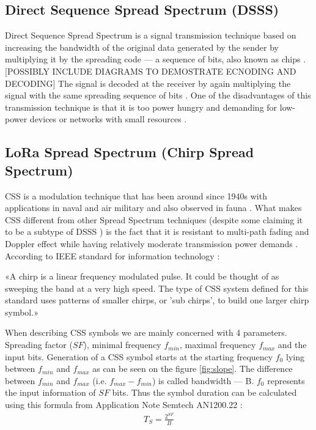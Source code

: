 \subsection{Direct Sequence Spread Spectrum (DSSS)}

Direct Sequence Spread Spectrum is a signal transmission technique based on increasing the bandwidth of the original data generated by the sender by multiplying it by the spreading code — a sequence of bits, also known as chips \cite{dsss_article}. [POSSIBLY INCLUDE DIAGRAMS TO DEMOSTRATE ECNODING AND DECODING] The signal is decoded at the receiver by again multiplying the signal with
the same spreading sequence of bits \cite{dsss_article}. One of the disadvantages of this transmission technique is that it is too power hungry and demanding for low-power devices or networks with small resources \cite{semtech_spec}.

\subsection{LoRa Spread Spectrum (Chirp Spread Spectrum)}

CSS is a modulation technique that has been around since 1940s \cite{semtech_spec} with 
applications in naval and air military and also observed in fauna \cite{origins}. What makes CSS different from other Spread Spectrum techniques (despite some claiming it to be a subtype of DSSS \cite{orthogonality_description}) is the fact that it is resistant to multi-path fading and Doppler effect while having relatively moderate transmission power demands \cite{semtech_spec}. \\

According to IEEE standard for information technology \cite{ieee_2007}: \\

\begin{addmargin}[4em]{2em}%
«A chirp is a linear frequency modulated pulse. It could be thought of as sweeping the band at a very high speed. The type of CSS system defined for this standard uses patterns of smaller chirps, or ’sub chirps’, to build one larger chirp symbol.» \\
\end{addmargin}

When describing CSS symbols we are mainly concerned with 4 parameters. 
Spreading factor ($SF$), minimal frequency $f_{min}$, maximal frequency $f_{max}$ and the input bits. Generation of a CSS symbol starts at the starting frequency $f_0$ lying between $f_{min}$ and $f_{max}$ as can be seen on the figure \ref{fig:slope}. The difference between $f_{min}$ and $f_{max}$ (i.e. $f_{max} - f_{min}$) is called bandwidth — B. $f_0$ represents the input information of $SF$ bits. Thus the symbol duration can be calculated using this formula from Application Note Semtech AN1200.22 \cite{semtech_spec}: 
\begin{align}
    T_S = \frac{2^{SF}}{B} 
\end{align}

